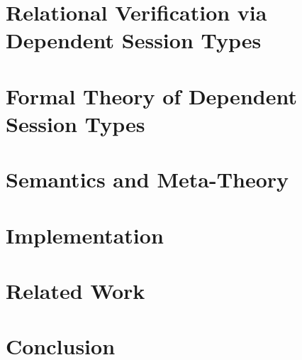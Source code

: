 \documentclass[acmsmall,10pt,anonymous]{acmart}
\begin{document}
\section{Relational Verification via Dependent Session Types}\label{sec:relational}


\section{Formal Theory of Dependent Session Types}\label{sec:theory}


\section{Semantics and Meta-Theory}\label{sec:semantics}


\section{Implementation}\label{sec:implementation}


\section{Related Work}\label{sec:related}


\section{Conclusion}\label{sec:conclusion}





\clearpage
\appendix

\end{document}
